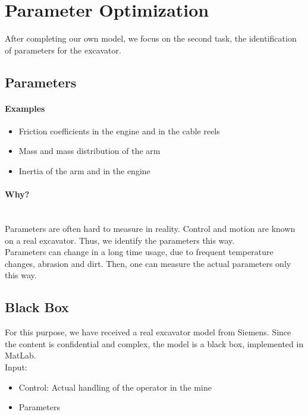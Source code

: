 \documentclass[a4paper]{article}
\begin{document}
\section{Parameter Optimization}

After completing our own model, we focus on the second task, the identification of parameters for the excavator.

\subsection{Parameters}

\paragraph{Examples}

\begin{itemize}
	\item{Friction coefficients in the engine and in the cable reels}
	\item{Mass and mass distribution of the arm}
	\item{Inertia of the arm and in the engine}
\end{itemize}

\paragraph{Why?} \hfill\\

Parameters are often hard to measure in reality. Control and motion are known on a real excavator. Thus, we identify the parameters this way. \\

Parameters can change in a long time usage, due to frequent temperature changes, abrasion and dirt. Then, one can measure the actual parameters only this way.

\subsection{Black Box}

For this purpose, we have received a real excavator model from Siemens. Since the content is confidential and complex, the model is a black box, implemented in MatLab. \\

Input:

\begin{itemize}
	\item{Control: Actual handling of the operator in the mine}
	\item{Parameters}
\end{itemize}
\end{document}
